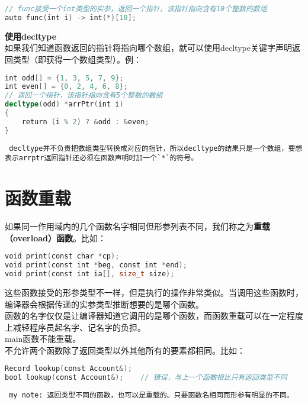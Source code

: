 \documentclass[
  a4paper,
  oneside,tablecaptionabove
]{scrbook}
\begin{document}
\begin{lstlisting}[language={C++}]
// func接受一个int类型的实参，返回一个指针，该指针指向含有10个整数的数组
auto func(int i) -> int(*)[10];
\end{lstlisting}

\textbf{使用decltype}\\
如果我们知道函数返回的指针将指向哪个数组，就可以使用decltype关键字声明返回类型（即获得一个数组类型）。例：

\begin{lstlisting}[language={C++}]
int odd[] = {1, 3, 5, 7, 9};
int even[] = {0, 2, 4, 6, 8};
// 返回一个指针，该指针指向含有5个整数的数组
decltype(odd) *arrPtr(int i)
{
    return (i % 2) ? &odd : &even;
}
\end{lstlisting}

\begin{lstlisting}
 decltype并不负责把数组类型转换成对应的指针，所以decltype的结果只是一个数组，要想表示arrptr返回指针还必须在函数声明时加一个`*`的符号。
\end{lstlisting}

\section{函数重载}\label{ux51fdux6570ux91cdux8f7d}

如果同一作用域内的几个函数名字相同但形参列表不同，我们称之为\textbf{重载（overload）函数}。比如：

\begin{lstlisting}[language={C++}]
void print(const char *cp);
void print(const int *beg, const int *end);
void print(const int ia[], size_t size);
\end{lstlisting}

这些函数接受的形参类型不一样，但是执行的操作非常类似。当调用这些函数时，编译器会根据传递的实参类型推断想要的是哪个函数。\\
函数的名字仅仅是让编译器知道它调用的是哪个函数，而函数重载可以在一定程度上减轻程序员起名字、记名字的负担。\\
main函数不能重载。\\
不允许两个函数除了返回类型以外其他所有的要素都相同。比如：

\begin{lstlisting}[language={C++}]
Record lookup(const Account&);
bool lookup(const Account&);    // 错误，与上一个函数相比只有返回类型不同
\end{lstlisting}

\begin{lstlisting}
 my note: 返回类型不同的函数，也可以是重载的。只要函数名相同而形参有明显的不同。  
\end{lstlisting}
\end{document}
